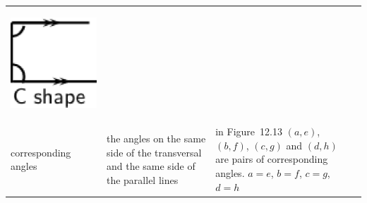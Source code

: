 \begin{center}
\begin{xtabular*}{\mytablewidth}[t]{|p{3cm}|p{3cm}|p{3cm}|p{20\mystarwidth}|}
    \setcounter{subfigure}{0}
\label{m39370*id316923}
    \begin{center}
    \label{m39370*id316923!!!underscore!!!media}\label{m39370*id316923!!!underscore!!!printimage}\includegraphics[width=.2\columnwidth]{col11306.imgs/m39370_MG10C13_013.png} %
      \vspace{2pt}
    \vspace{.1in}
    \end{center}    
     \tabularnewline{}
        corresponding angles &
        the angles on the same side of the transversal and the same side of the parallel lines &
        in Figure~12.13 \begin{math}\left(a,e\right)\end{math}, \begin{math}\left(b,f\right)\end{math}, \begin{math}\left(c,g\right)\end{math} and \begin{math}\left(d,h\right)\end{math} are pairs of corresponding angles.  \begin{math}a=e\end{math}, \begin{math}b=f\end{math}, \begin{math}c=g\end{math}, \begin{math}d=h\end{math} &

\end{xtabular*}
\end{center}
